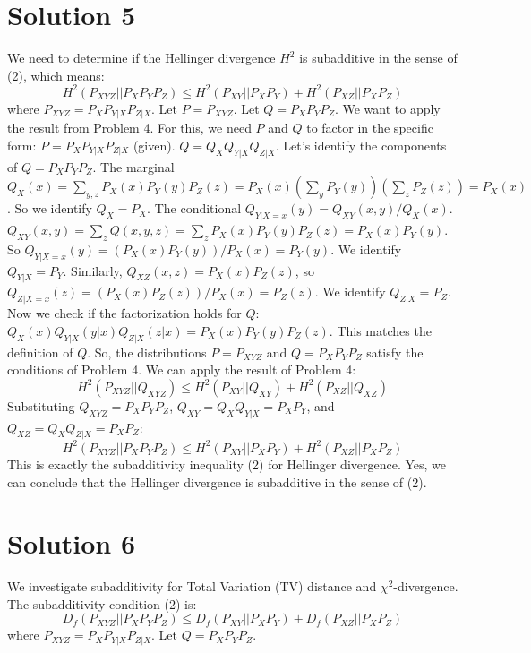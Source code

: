 \documentclass{article}
\begin{document}
\section*{Solution 5}
We need to determine if the Hellinger divergence $H^2$ is subadditive in the sense of (2), which means:
\[ H^2(P_{XYZ} || P_X P_Y P_Z) \le H^2(P_{XY} || P_X P_Y) + H^2(P_{XZ} || P_X P_Z) \]
where $P_{XYZ} = P_X P_{Y|X} P_{Z|X}$.
Let $P = P_{XYZ}$. Let $Q = P_X P_Y P_Z$.
We want to apply the result from Problem 4. For this, we need $P$ and $Q$ to factor in the specific form:
$P = P_X P_{Y|X} P_{Z|X}$ (given).
$Q = Q_X Q_{Y|X} Q_{Z|X}$.
Let's identify the components of $Q = P_X P_Y P_Z$.
The marginal $Q_X(x) = \sum_{y,z} P_X(x) P_Y(y) P_Z(z) = P_X(x) (\sum_y P_Y(y)) (\sum_z P_Z(z)) = P_X(x)$. So we identify $Q_X = P_X$.
The conditional $Q_{Y|X=x}(y) = Q_{XY}(x,y) / Q_X(x)$.
$Q_{XY}(x,y) = \sum_z Q(x,y,z) = \sum_z P_X(x) P_Y(y) P_Z(z) = P_X(x) P_Y(y)$.
So $Q_{Y|X=x}(y) = (P_X(x) P_Y(y)) / P_X(x) = P_Y(y)$. We identify $Q_{Y|X} = P_Y$.
Similarly, $Q_{XZ}(x,z) = P_X(x) P_Z(z)$, so $Q_{Z|X=x}(z) = (P_X(x) P_Z(z)) / P_X(x) = P_Z(z)$. We identify $Q_{Z|X} = P_Z$.
Now we check if the factorization holds for $Q$:
$Q_X(x) Q_{Y|X}(y|x) Q_{Z|X}(z|x) = P_X(x) P_Y(y) P_Z(z)$. This matches the definition of $Q$.
So, the distributions $P = P_{XYZ}$ and $Q = P_X P_Y P_Z$ satisfy the conditions of Problem 4.
We can apply the result of Problem 4:
\[ H^2(P_{XYZ} || Q_{XYZ}) \le H^2(P_{XY} || Q_{XY}) + H^2(P_{XZ} || Q_{XZ}) \]
Substituting $Q_{XYZ} = P_X P_Y P_Z$, $Q_{XY} = Q_X Q_{Y|X} = P_X P_Y$, and $Q_{XZ} = Q_X Q_{Z|X} = P_X P_Z$:
\[ H^2(P_{XYZ} || P_X P_Y P_Z) \le H^2(P_{XY} || P_X P_Y) + H^2(P_{XZ} || P_X P_Z) \]
This is exactly the subadditivity inequality (2) for Hellinger divergence.
Yes, we can conclude that the Hellinger divergence is subadditive in the sense of (2).

\section*{Solution 6}
We investigate subadditivity for Total Variation (TV) distance and $\chi^2$-divergence. The subadditivity condition (2) is:
\[ D_f(P_{XYZ} || P_X P_Y P_Z) \le D_f(P_{XY} || P_X P_Y) + D_f(P_{XZ} || P_X P_Z) \]
where $P_{XYZ} = P_X P_{Y|X} P_{Z|X}$. Let $Q = P_X P_Y P_Z$.
\end{document}
